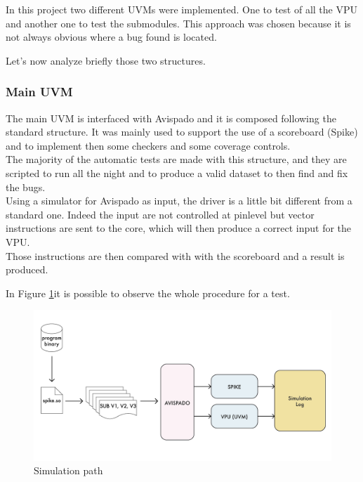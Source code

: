 In this project two different UVMs were implemented. One to test of all the VPU and another one to test the submodules. This approach was chosen because it is not always obvious where a bug found is located.

Let's now analyze briefly those two structures.
\subsubsection{Main UVM}
The main UVM is interfaced with Avispado and it is composed following the standard structure. It was mainly used to support the use of a scoreboard (Spike) and to implement then some checkers and some coverage controls.\\

The majority of the automatic tests are made with this structure, and they are scripted to run all the night and to produce a valid dataset to then find and fix the bugs.\\

Using a simulator for Avispado as input, the driver is a little bit different from a standard one. Indeed the input are not controlled at pinlevel but vector instructions are sent to the core, which will then produce a correct input for the VPU.\\

Those instructions are then compared with with the scoreboard and a result is produced.

In Figure \ref{bin-to-log}it is possible to observe the whole procedure for a test.

\begin{figure}[H]
    \centering
    \includegraphics[scale = 0.5]{Chapter_1/img/bin-to-log.png}
    \caption{Simulation path}
    \label{bin-to-log}
\end{figure}




